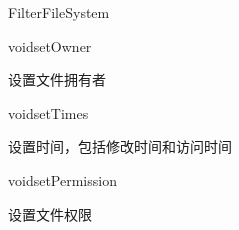 \begin{XeClass}{FilterFileSystem}
    \begin{XeMethod}{\XePublic}{void}{setOwner}
         
 设置文件拥有者

    \end{XeMethod}

    \begin{XeMethod}{\XePublic}{void}{setTimes}
         
 设置时间，包括修改时间和访问时间

    \end{XeMethod}

    \begin{XeMethod}{\XePublic}{void}{setPermission}
         
 设置文件权限

    \end{XeMethod}

\end{XeClass}
